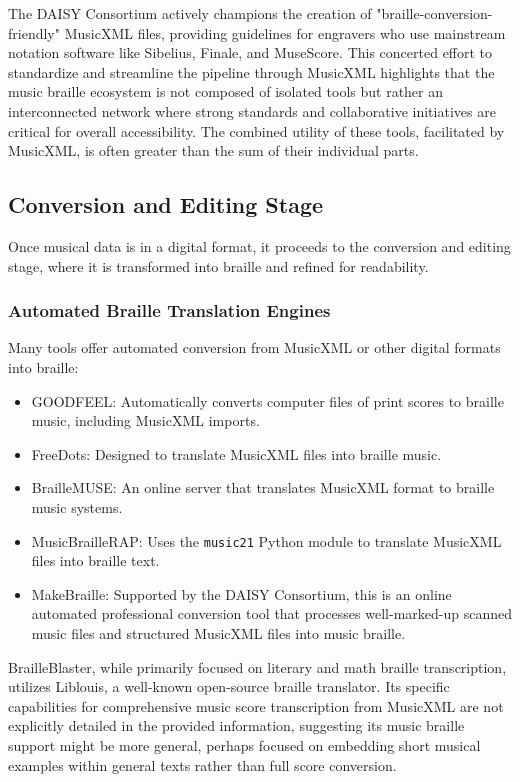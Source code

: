 The DAISY Consortium actively champions the creation of "braille-conversion-friendly" MusicXML files, providing guidelines for engravers who use mainstream notation software like Sibelius, Finale, and MuseScore. \cite{daisy-musicxml} This concerted effort to standardize and streamline the pipeline through MusicXML highlights that the music braille ecosystem is not composed of isolated tools but rather an interconnected network where strong standards and collaborative initiatives are critical for overall accessibility. The combined utility of these tools, facilitated by MusicXML, is often greater than the sum of their individual parts.

\subsection{Conversion and Editing Stage}
Once musical data is in a digital format, it proceeds to the conversion and editing stage, where it is transformed into braille and refined for readability.

\subsubsection{Automated Braille Translation Engines}
Many tools offer automated conversion from MusicXML or other digital formats into braille:
\begin{itemize}
    \item GOODFEEL: Automatically converts computer files of print scores to braille music, including MusicXML imports. \cite{dancingdots-goodfeel}
    \item FreeDots: Designed to translate MusicXML files into braille music. \cite{blindguru-freedots}
    \item BrailleMUSE: An online server that translates MusicXML format to braille music systems. \cite{braillemuse}
    \item MusicBrailleRAP: Uses the \texttt{music21} Python module to translate MusicXML files into braille text. \cite{github-braillerap}
    \item MakeBraille: Supported by the DAISY Consortium, this is an online automated professional conversion tool that processes well-marked-up scanned music files and structured MusicXML files into music braille. \cite{daisy-musicxml}
\end{itemize}

BrailleBlaster, while primarily focused on literary and math braille transcription, utilizes Liblouis, a well-known open-source braille translator. \cite{aph-brailleblaster} Its specific capabilities for comprehensive music score transcription from MusicXML are not explicitly detailed in the provided information, suggesting its music braille support might be more general, perhaps focused on embedding short musical examples within general texts rather than full score conversion.

